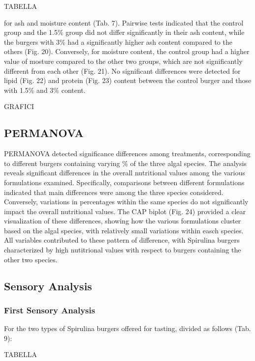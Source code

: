 TABELLA

for ash and moisture content (Tab. 7). Pairwise tests indicated that the control group and the 1.5\% group did not differ significantly in their ash content, while the burgers with 3\%  had a significantly higher ash content compared to the others (Fig. 20). Conversely, for moisture content, the control group had a higher value of mosture compared to the other two groups, which are not significantly different from each other (Fig. 21). No significant differences were detected for lipid (Fig. 22) and protein (Fig. 23) content between the control burger and those with 1.5\% and 3\% content.



GRAFICI

\subsection{PERMANOVA}
PERMANOVA detected significance differences among treatments, corresponding to different burgers containing varying \% of the three algal species. The analysis reveals significant differences in the overall nutritional values among the various formulations examined. Specifically, comparisons between different formulations indicated that main differences were among the three species considered. Conversely, variations in percentages within the same species do not significantly impact the overall nutritional values.
The CAP biplot (Fig. 24) provided a clear visualization of these differences, showing how the various formulations cluster based on the algal species, with relatively small variations within easch species. All variables contributed to these pattern of difference, with Spirulina burgers characterized by high nutitrional values with respect to burgers containing the other two species.

\subsection{Sensory Analysis}
\subsubsection{First Sensory Analysis}
For the two types of Spirulina burgers offered for tasting, divided as follows (Tab. 9):

TABELLA


